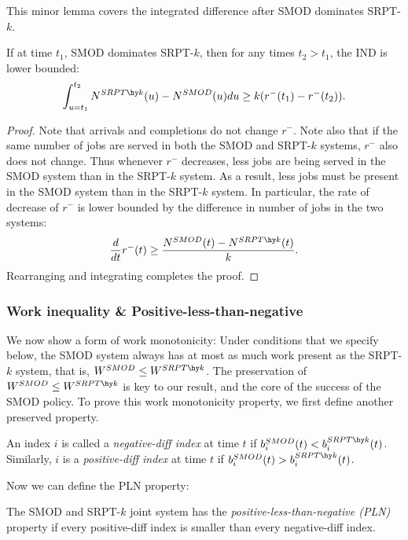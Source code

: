 \documentclass[acmsmall]{acmart}
\begin{document}
This minor lemma covers the integrated difference after SMOD dominates SRPT-$k$.
\begin{lemma}
    \label{lem:negative-bounds-diff}
    If at time $t_1$, SMOD dominates SRPT-$k$, then for any times $t_2 > t_1$,
    the IND is lower bounded:
    \begin{align*}
        \int_{u=t_1}^{t_2} N^{SRPT\hy k}(u) - N^{SMOD}(u) du \ge k(r^-(t_1) - r^-(t_2)).
    \end{align*}
\end{lemma}
\begin{proof}
    Note that arrivals and completions do not change $r^-$.
    Note also that if the same number of jobs are served in both the SMOD and SRPT-$k$ systems,
    $r^-$ also does not change.
    Thus whenever $r^-$ decreases, less jobs are being served in the SMOD system than in the SRPT-$k$ system.
    As a result, less jobs must be present in the SMOD system than in the SRPT-$k$ system.
    In particular, the rate of decrease of $r^-$ is lower bounded by the difference in number of jobs in the two systems:
    \begin{align*}
        \frac{d}{dt}r^-(t) \ge \frac{N^{SMOD}(t) - N^{SRPT\hy k}(t)}{k}.
    \end{align*}
    Rearranging and integrating completes the proof.
\end{proof}

\subsubsection{Work inequality \& Positive-less-than-negative}
\label{sec:work-ineq}

We now show a form of work monotonicity:
Under conditions that we specify below, the SMOD system always has at most as much work present as the SRPT-$k$ system, that is, $W^{SMOD}\leq W^{SRPT\hy k}$.  
The preservation of $W^{SMOD} \le W^{SRPT\hy k}$ is key to our result, and the core of the success of the SMOD policy.
To prove this work monotonicity property, we first define another preserved property.

\begin{definition}
    An index $i$ is called a \textit{negative-diff index} at time $t$ if $b^{SMOD}_i(t) < b^{SRPT\hy k}_i(t)$. Similarly, $i$ is a \textit{positive-diff index} at time $t$ if $b^{SMOD}_i(t) > b^{SRPT\hy k}_i(t)$.
\end{definition}


Now we can define the PLN property:
\begin{definition}
    \label{def:pln}
    The SMOD and SRPT-$k$ joint system has the \textit{positive-less-than-negative (PLN)} property
    if every positive-diff index is smaller than every negative-diff index.
\end{definition}
\end{document}
